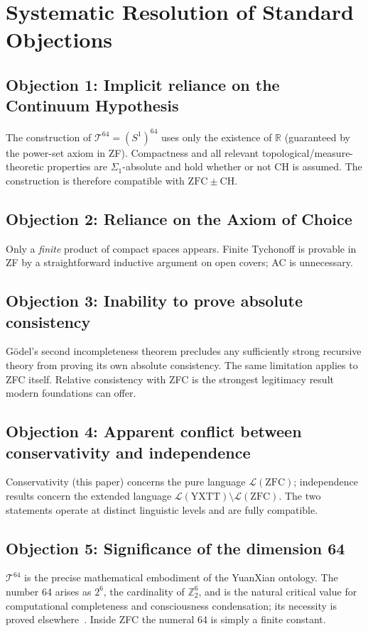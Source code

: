 \documentclass[12pt,a4paper]{article}
\theoremstyle{plain}
\theoremstyle{definition}
\newcommand{\Tsixtyfour}{\mathcal{T}^{64}}
\newcommand{\R}{\mathbb{R}}
\newcommand{\Z}{\mathbb{Z}}
\newcommand{\YXTT}{\mathrm{YXTT}}
\newcommand{\ZFC}{\mathrm{ZFC}}
\newcommand{\CH}{\mathrm{CH}}
\begin{document}
\section{Systematic Resolution of Standard Objections}
\label{sec:objections}

\subsection{Objection 1: Implicit reliance on the Continuum Hypothesis}
The construction of $\Tsixtyfour=(S^1)^{64}$ uses only the existence of $\R$ (guaranteed by the power-set axiom in ZF). Compactness and all relevant topological/measure-theoretic properties are $\Sigma_1$-absolute and hold whether or not CH is assumed. The construction is therefore compatible with $\ZFC\pm\CH$.

\subsection{Objection 2: Reliance on the Axiom of Choice}
Only a \emph{finite} product of compact spaces appears. Finite Tychonoff is provable in ZF by a straightforward inductive argument on open covers; AC is unnecessary.

\subsection{Objection 3: Inability to prove absolute consistency}
Gödel's second incompleteness theorem precludes any sufficiently strong recursive theory from proving its own absolute consistency. The same limitation applies to ZFC itself. Relative consistency with ZFC is the strongest legitimacy result modern foundations can offer.

\subsection{Objection 4: Apparent conflict between conservativity and independence}
Conservativity (this paper) concerns the pure language $\mathcal{L}(\ZFC)$; independence results concern the extended language $\mathcal{L}(\YXTT)\setminus\mathcal{L}(\ZFC)$. The two statements operate at distinct linguistic levels and are fully compatible.

\subsection{Objection 5: Significance of the dimension 64}
$\Tsixtyfour$ is the precise mathematical embodiment of the YuanXian ontology. The number 64 arises as $2^6$, the cardinality of $\Z_2^6$, and is the natural critical value for computational completeness and consciousness condensation; its necessity is proved elsewhere~\cite{yxt2026dimension}. Inside ZFC the numeral 64 is simply a finite constant.
\end{document}
